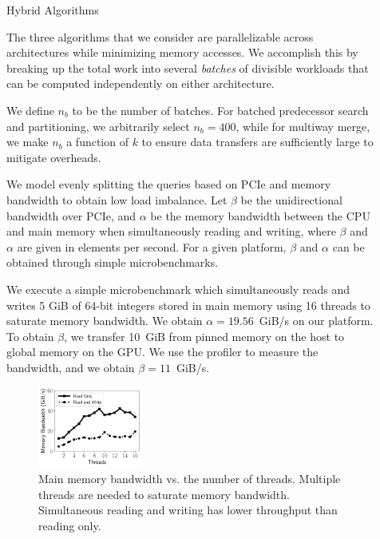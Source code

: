 \documentclass[final]{beamer}
\newlength{\sepwidth}
\newlength{\colwidth}
\newcommand{\separatorcolumn}{\begin{column}{\sepwidth}\end{column}}
\begin{document}
\begin{frame}[t]
\begin{columns}[t]
\begin{column}{\colwidth}
\end{column}

\separatorcolumn

\begin{column}{\colwidth}

 \begin{block}{Hybrid Algorithms}

 \begin{description}[font=$\bullet$~\normalfont\scshape\color{red!50!black}]
\item The three algorithms that we consider are parallelizable across architectures while minimizing memory accesses. We accomplish this by breaking up the total work into several \emph{batches} of divisible workloads that can be computed independently on either architecture. 

\item We define $n_b$ to be the number of batches. For batched predecessor search and partitioning, we arbitrarily select $n_b=400$, while for multiway merge, we make $n_b$ a function of $k$ to ensure data transfers are sufficiently large to mitigate overheads.

\item We model evenly splitting the queries based on PCIe and memory bandwidth to obtain low load imbalance. Let $\beta$ be the unidirectional bandwidth over PCIe, and $\alpha$ be the memory bandwidth between the CPU and main memory when simultaneously reading and writing, where $\beta$ and $\alpha$ are given in elements per second. For a given platform, $\beta$ and  $\alpha$ can be obtained through simple microbenchmarks.

\item We execute a simple microbenchmark which simultaneously reads and writes 5 GiB of 64-bit integers stored in main memory using 16 threads to saturate memory bandwidth. We obtain $\alpha=19.56$~GiB/s on our platform. To obtain $\beta$, we transfer 10~GiB from pinned memory on the host to global memory on the GPU. We use the profiler to measure the bandwidth, and we obtain $\beta=11$~GiB/s. 



\begin{figure}[htp]
\centering
    \includegraphics[width=0.34\textwidth, trim={0.5cm 0.85cm 0.5cm 1cm}]{figures/microbenchmarks_time_vs_threads.pdf}	
    \caption{Main memory bandwidth vs. the number of threads. Multiple threads are needed to saturate memory bandwidth. Simultaneous reading and writing has lower throughput than reading only.}
   \label{fig:mem_bandwidth_scalability}
\end{figure}


\end{description}
\end{block}
\end{column}
\end{columns}
\end{frame}
\end{document}
